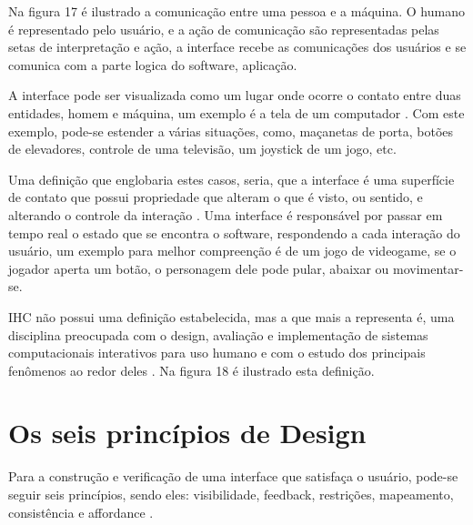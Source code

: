 \documentclass[12pt,oneside,a4paper,chapter=TITLE,section=TITLE,sumario=tradicional]{abntex2}
\begin{document}
Na figura 17 é ilustrado a comunicação entre uma pessoa e a máquina. O humano é representado pelo usuário, e a ação de comunicação são representadas pelas setas de interpretação e ação, a interface recebe as comunicações dos usuários e se comunica com a parte logica do software, aplicação.

\begin{figure}[htb]
\end{figure}

A interface pode ser visualizada como um lugar onde ocorre o contato entre duas entidades, homem e máquina, um exemplo é a tela de um computador \cite{rocha2003}. Com este exemplo, pode-se estender a várias situações, como, maçanetas de porta, botões de elevadores, controle de uma televisão, um joystick de um jogo, etc.

Uma definição que englobaria estes casos, seria, que a interface é uma superfície de contato que possui propriedade que alteram o que é visto, ou sentido, e alterando o controle da interação \cite{laurel1993}. Uma interface é responsável por passar em tempo real o estado que se encontra o software, respondendo a cada interação do usuário, um exemplo para melhor compreenção é de um jogo de videogame, se o jogador aperta um botão, o personagem dele pode pular, abaixar ou movimentar-se.

IHC não possui uma definição estabelecida, mas a que mais a representa é, uma disciplina preocupada com o design, avaliação e implementação de sistemas computacionais interativos para uso humano e com o estudo dos principais fenômenos ao redor deles \cite{rocha2003}. Na figura 18 é ilustrado esta definição.

\begin{figure}[htb]
\end{figure}

\section{Os seis princípios de Design}
\label{sec:seisprincipios}

Para a construção e verificação de uma interface que satisfaça o usuário, pode-se seguir seis princípios, sendo eles: visibilidade, feedback, restrições, mapeamento, consistência e affordance \cite{norman2002}.
\end{document}
